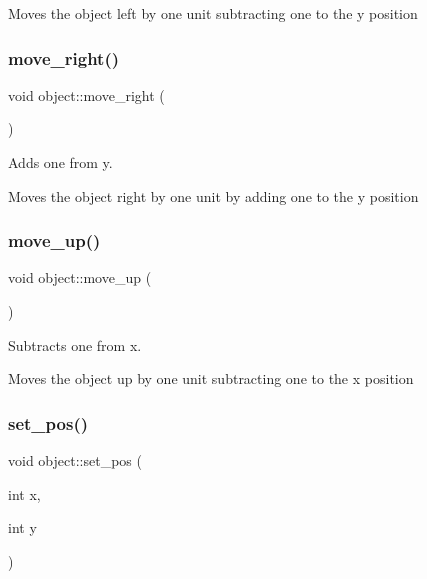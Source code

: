 Moves the object left by one unit subtracting one to the y position \mbox{\label{classobject_aeee28bb1b3f967e374c2878ddc4c57df}} 
\subsubsection{\texorpdfstring{move\+\_\+right()}{move\_right()}}
{\footnotesize\ttfamily void object\+::move\+\_\+right (\begin{DoxyParamCaption}{ }\end{DoxyParamCaption})}



Adds one from y. 

Moves the object right by one unit by adding one to the y position \mbox{\label{classobject_afeb4c581ea86494f8063f286664adbe6}} 
\subsubsection{\texorpdfstring{move\+\_\+up()}{move\_up()}}
{\footnotesize\ttfamily void object\+::move\+\_\+up (\begin{DoxyParamCaption}{ }\end{DoxyParamCaption})}



Subtracts one from x. 

Moves the object up by one unit subtracting one to the x position \mbox{\label{classobject_a303b713cf517cebb6b56476facc9022f}} 
\subsubsection{\texorpdfstring{set\+\_\+pos()}{set\_pos()}}
{\footnotesize\ttfamily void object\+::set\+\_\+pos (\begin{DoxyParamCaption}\item[{int}]{x,  }\item[{int}]{y }\end{DoxyParamCaption})\hspace{0.3cm}{\ttfamily [inline]}}



